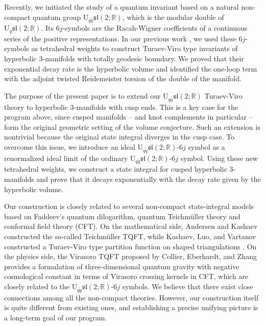\documentclass[11pt]{article}
\theoremstyle{remark}
\theoremstyle{remark}
\numberwithin{equation}{section}
\begin{document}
Recently, we initiated the study of a quantum invariant based on a natural non-compact quantum group $\mathrm {U}_{q\tilde q}\mathfrak{sl}(2;\mathbb R)$, which is the modular double of
$\mathrm {U}_{q}\mathfrak{sl}(2;\mathbb R)$.
Its $6j$-symbols are the Racah-Wigner coefficients of a continuous
series of the positive representations.  In our previous
work \cite{LMSWY}, we used these $6j$-symbols as tetrahedral weights
to construct Turaev-Viro type invariants of hyperbolic $3$-manifolds
with totally geodesic boundary.  We proved that their exponential decay
rate is the hyperbolic volume and identified the one-loop term with the
adjoint twisted Reidemeister torsion of the double of the manifold.

The purpose of the present paper is to extend our $\mathrm U_{q\tilde q}\mathfrak{sl}(2;\mathbb R)$ Turaev-Viro theory to hyperbolic $3$-manifolds with cusp
ends.  This is a key case for the program above, since cusped
manifolds -- and knot complements in particular -- form the original
geometric setting of the volume conjecture.  Such an
extension is nontrivial because the original state integral diverges in the cusp case. 
To overcome this issue, we introduce an ideal
$\mathrm U_{q\tilde q}\mathfrak{sl}(2;\mathbb R)$-$6j$ symbol as a
renormalized ideal limit of the ordinary $\mathrm {U}_{q\tilde q}\mathfrak{sl}(2;\mathbb R)$-$6j$ symbol. Using
these new tetrahedral weights, we construct a state integral for cusped
hyperbolic $3$-manifolds and prove that it decays exponentially with the decay rate
given by the hyperbolic volume. 


Our construction is closely related to several non-compact state-integral
models based on Faddeev's quantum dilogarithm, quantum Teichm\"uller
theory and conformal field theory (CFT). On the mathematical side,  Andersen and Kashaev constructed the so-called Teichm\"uller TQFT, while
Kashaev, Luo, and Vartanov constructed a Turaev-Viro type partition
function on shaped triangulations \cite{AndersenKashaev,KashaevLuoVartanov}.  
On the physics side, the Virasoro TQFT proposed
by Collier, Eberhardt, and Zhang~\cite{CollierEberhardtZhang} provides a formulation of
three-dimensional quantum gravity with negative cosmological constant
in terms of Virasoro crossing kernels in CFT, which are closely related
to the $\mathrm U_{q\tilde q}\mathfrak{sl}(2;\mathbb R)$-$6j$ symbols. We believe that there exist close connections among all the non-compact theories. However, our construction itself is quite different from existing ones, and establishing a precise unifying picture is a long-term goal of our program. 
\end{document}
